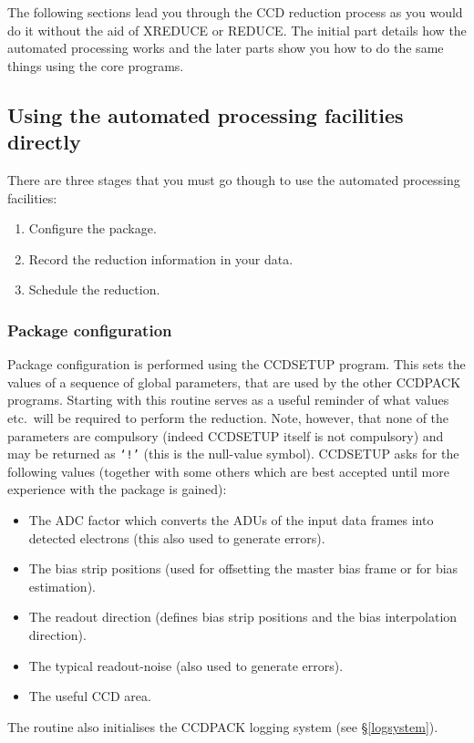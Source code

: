 \documentclass[twoside,11pt]{article}
\newcommand{\hyperref}[4]{#2\ref{#4}#3}
\newcommand{\htmlref}[2]{#1}
\newcommand{\xlabel}[1]{}
\renewcommand{\_}{\texttt{\symbol{95}}}
\newcommand{\text}[1]{{\small \tt #1}}
\newcommand{\routine}[1]{{\sc #1}}
\newcommand{\xroutine}[1]{\htmlref{{\sc #1}}{#1}}
\begin{document}
The following sections lead you through the CCD reduction process as
you would do it without the aid of \xroutine{XREDUCE} or
\xroutine{REDUCE}.
The initial part details how the automated processing works and the
later parts show you how to do the same things using the core programs.

\subsection{Using the automated processing facilities directly}

There are three stages that you must go though to use the automated
processing facilities:
\begin{enumerate}
\item Configure the package.
\item Record the reduction information in your data.
\item Schedule the reduction.
\end{enumerate}

\subsubsection{Package configuration\xlabel{configuration}
               \label{configuration}}
Package configuration is performed using the \xroutine{CCDSETUP}
program.
This sets the values of a sequence of global parameters, that are used
by the other CCDPACK programs.
Starting with this routine serves as a useful reminder of what values
etc.\ will be required to perform the reduction.
Note, however, that none of the parameters are compulsory (indeed
\routine{CCDSETUP} itself is not compulsory) and may be returned as \text{`!'}
(this is the null-value symbol).
\routine{CCDSETUP} asks for the following values (together with some others
which are best accepted until more experience with the package is
gained):
\begin{itemize}
\item The ADC factor which converts the
ADUs of the input data frames into detected electrons (this also
used to generate errors).
\item The bias strip positions (used for offsetting the master bias
frame or for bias estimation).
\item The readout direction (defines bias strip positions and the
bias interpolation direction).
\item The typical readout-noise (also used to generate errors).
\item The useful CCD area.
\end{itemize}
The routine also initialises the CCDPACK logging system (see
\hyperref{later}{\S}{}{logsystem}).
\end{document}
